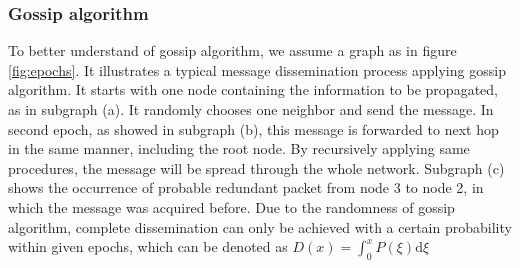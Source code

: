 \subsubsection{Gossip algorithm}
To better understand of gossip algorithm, we assume a graph as in figure \ref{fig:epochs}. It illustrates a typical message dissemination process applying gossip algorithm. It starts with one node containing the information to be propagated, as in subgraph (a). It randomly chooses one neighbor and send the message. In second epoch, as showed in subgraph (b), this message is  forwarded to next hop in the same manner, including the root node. By recursively applying same procedures, the message will be spread through the whole network. Subgraph (c) shows the occurrence of probable redundant packet from node 3 to node 2, in which the message was acquired before. Due to the randomness of gossip algorithm, complete dissemination can only be achieved with a certain probability within given epochs, which can be denoted as $D(x)=\int_0^x P(\xi)\mathrm{d}\xi$
